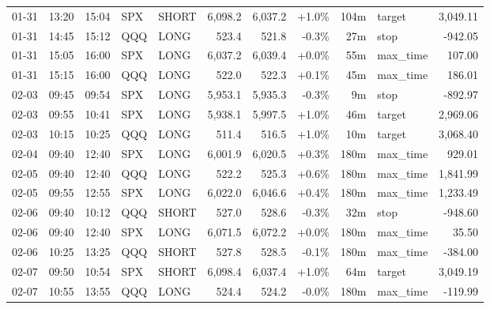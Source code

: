 \documentclass[11pt,a4paper,twoside]{article}
\begin{document}
\begin{center}
\begin{longtable}{>{\color{txtmain}}l l l l l r r r r >{\color{txtmain}}l r}
01-31 & 13:20 & 15:04 & SPX & SHORT & 6,098.2 & 6,037.2 & \textcolor{wingreen}{+1.0\%} & 104m & target & \textcolor{wingreen}{3,049.11} \\
01-31 & 14:45 & 15:12 & QQQ & LONG & 523.4 & 521.8 & \textcolor{lossred}{-0.3\%} & 27m & stop & \textcolor{lossred}{-942.05} \\
01-31 & 15:05 & 16:00 & SPX & LONG & 6,037.2 & 6,039.4 & \textcolor{wingreen}{+0.0\%} & 55m & max\_time & \textcolor{wingreen}{107.00} \\
01-31 & 15:15 & 16:00 & QQQ & LONG & 522.0 & 522.3 & \textcolor{wingreen}{+0.1\%} & 45m & max\_time & \textcolor{wingreen}{186.01} \\
02-03 & 09:45 & 09:54 & SPX & LONG & 5,953.1 & 5,935.3 & \textcolor{lossred}{-0.3\%} & 9m & stop & \textcolor{lossred}{-892.97} \\
02-03 & 09:55 & 10:41 & SPX & LONG & 5,938.1 & 5,997.5 & \textcolor{wingreen}{+1.0\%} & 46m & target & \textcolor{wingreen}{2,969.06} \\
02-03 & 10:15 & 10:25 & QQQ & LONG & 511.4 & 516.5 & \textcolor{wingreen}{+1.0\%} & 10m & target & \textcolor{wingreen}{3,068.40} \\
02-04 & 09:40 & 12:40 & SPX & LONG & 6,001.9 & 6,020.5 & \textcolor{wingreen}{+0.3\%} & 180m & max\_time & \textcolor{wingreen}{929.01} \\
02-05 & 09:40 & 12:40 & QQQ & LONG & 522.2 & 525.3 & \textcolor{wingreen}{+0.6\%} & 180m & max\_time & \textcolor{wingreen}{1,841.99} \\
02-05 & 09:55 & 12:55 & SPX & LONG & 6,022.0 & 6,046.6 & \textcolor{wingreen}{+0.4\%} & 180m & max\_time & \textcolor{wingreen}{1,233.49} \\
02-06 & 09:40 & 10:12 & QQQ & SHORT & 527.0 & 528.6 & \textcolor{lossred}{-0.3\%} & 32m & stop & \textcolor{lossred}{-948.60} \\
02-06 & 09:40 & 12:40 & SPX & LONG & 6,071.5 & 6,072.2 & \textcolor{wingreen}{+0.0\%} & 180m & max\_time & \textcolor{wingreen}{35.50} \\
02-06 & 10:25 & 13:25 & QQQ & SHORT & 527.8 & 528.5 & \textcolor{lossred}{-0.1\%} & 180m & max\_time & \textcolor{lossred}{-384.00} \\
02-07 & 09:50 & 10:54 & SPX & SHORT & 6,098.4 & 6,037.4 & \textcolor{wingreen}{+1.0\%} & 64m & target & \textcolor{wingreen}{3,049.19} \\
02-07 & 10:55 & 13:55 & QQQ & LONG & 524.4 & 524.2 & \textcolor{lossred}{-0.0\%} & 180m & max\_time & \textcolor{lossred}{-119.99} \\

\end{longtable}
\end{center}
\end{document}
